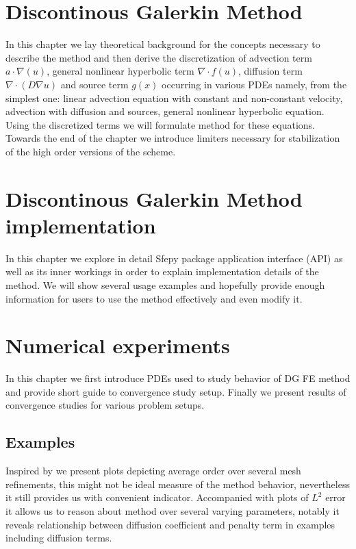 \documentclass{book}
\theoremstyle{definition}
\numberwithin{equation}{section}
\numberwithin{table}{section}
\begin{document}
\chapter{Discontinous Galerkin Method}
\label{ch:theory}
In this chapter we lay theoretical background for the concepts necessary to describe the 
method and then derive the discretization of advection term $a\cdot\nabla(u)$, general 
nonlinear hyperbolic term $\nabla\cdot f(u)$, diffusion term $\nabla \cdot (D 
\nabla u)$ and source term $g(x)$ occurring in various PDEs namely, from the 
simplest one: linear advection equation with constant and non-constant velocity, 
advection with diffusion and sources, general nonlinear hyperbolic equation.
Using the discretized terms we will formulate method for these equations. Towards the end 
of the chapter we introduce limiters necessary for stabilization of the high order 
versions of the scheme.




\chapter{Discontinous Galerkin Method implementation}
\label{ch:implementation}
In this chapter we explore in detail Sfepy package application interface (API) 
as well as its inner workings in order to explain implementation details of the 
method. We will show several usage examples and hopefully provide enough 
information for users to use the method effectively and even modify it.




\chapter{Numerical experiments}
\label{ch:convergence}
In this chapter we first introduce PDEs used to study behavior of DG FE method and 
provide short guide to convergence study setup. 
Finally we present results of convergence studies for various problem setups.



\section{Examples}
Inspired by \cite{Kucera} we present plots depicting average order over several 
mesh refinements, this might not be ideal measure of the method behavior, nevertheless it 
still provides us with convenient indicator. Accompanied with plots of $L^2$ error it 
allows us to reason about method over several varying parameters, notably it reveals 
relationship between diffusion coefficient and penalty term in examples including 
diffusion terms.
\end{document}
